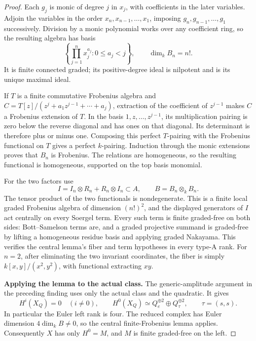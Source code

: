 \documentclass[11pt,a4paper]{article}
\theoremstyle{named}\newtheorem{finding}{Finding}[section]
\theoremstyle{definition}\newtheorem{definition}[finding]{Definition}
\theoremstyle{remark}\newtheorem{remark}[finding]{Remark}
\begin{document}
\begin{proof}
Each \(g_j\) is monic of degree \(j\) in \(x_j\), with
coefficients in the later variables. Adjoin the variables in
the order \(x_n,x_{n-1},\ldots,x_1\), imposing
\(g_n,g_{n-1},\ldots,g_1\) successively.
Division by a monic polynomial works over any coefficient
ring, so the resulting algebra has basis
\[
 \left\{\prod_{j=1}^n x_j^{a_j}:0\le a_j<j\right\},
 \qquad \dim_k B_n=n!.
\]
It is finite connected graded; its positive-degree ideal is
nilpotent and is its unique maximal ideal.

If \(T\) is a finite commutative Frobenius algebra and
\(C=T[z]/(z^j+a_1z^{j-1}+\cdots+a_j)\), extraction of
the coefficient of \(z^{j-1}\) makes \(C\) a Frobenius
extension of \(T\). In the basis \(1,z,\ldots,z^{j-1}\),
its multiplication pairing is zero below the reverse
diagonal and has ones on that diagonal. Its determinant is
therefore plus or minus one. Composing this perfect
\(T\)-pairing with the Frobenius functional on \(T\)
gives a perfect \(k\)-pairing. Induction through the monic
extensions proves that \(B_n\) is Frobenius. The relations
are homogeneous, so the resulting functional is homogeneous,
supported on the top basis monomial.

For the two factors use
\[
 I=I_n\otimes R_n+R_n\otimes I_n\subset A,
 \qquad B=B_n\otimes_k B_n.
\]
The tensor product of the two functionals is nondegenerate.
This is a finite local graded Frobenius algebra of dimension
\((n!)^2\), and the displayed generators of \(I\) act
centrally on every Soergel term. Every such term is finite
graded-free on both sides: Bott--Samelson terms are, and a
graded projective summand is graded-free by lifting a
homogeneous residue basis and applying graded Nakayama.
This verifies the central lemma's fiber and term hypotheses
in every type-A rank. For \(n=2\), after eliminating the
two invariant coordinates, the fiber is simply
\(k[x,y]/(x^2,y^2)\), with functional extracting \(xy\).

\par\smallskip\noindent\textbf{Applying the lemma to the actual class.}\quad
The generic-amplitude argument in the preceding finding
uses only the actual class and the quadratic. It gives
\begin{equation}\label{eq:boundedSoergelgenericsupport}
 H^i(X_Q)=0\quad(i\ne0),\qquad
 H^0(X_Q)\simeq Q_e^{\oplus2}\oplus Q_\tau^{\oplus2},
 \qquad\tau=(s,s).
\end{equation}
In particular the Euler left rank is four. The reduced
complex has Euler dimension \(4\dim_kB\ne0\), so the
central finite-Frobenius lemma applies. Consequently
\(X\) has only \(H^0=M\), and \(M\) is finite
graded-free on the left.


\end{proof}
\end{document}
